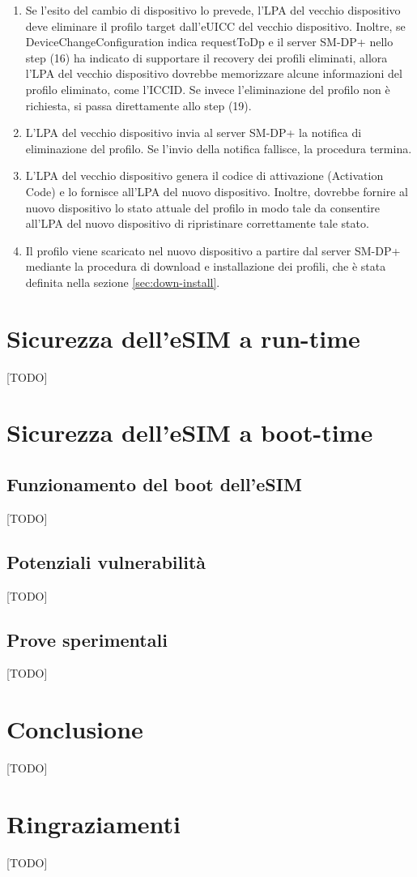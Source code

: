 \documentclass[10pt, twoside, openany]{book}
\begin{document}
\begin{enumerate}
\item Se l'esito del cambio di dispositivo lo prevede, l'LPA del vecchio dispositivo deve eliminare il profilo target dall'eUICC del vecchio dispositivo. Inoltre, se DeviceChangeConfiguration indica requestToDp e il server SM-DP+ nello step (16) ha indicato di supportare il recovery dei profili eliminati, allora l'LPA del vecchio dispositivo dovrebbe memorizzare alcune informazioni del profilo eliminato, come l'ICCID. Se invece l'eliminazione del profilo non è richiesta, si passa direttamente allo step (19).
\item L'LPA del vecchio dispositivo invia al server SM-DP+ la notifica di eliminazione del profilo. Se l'invio della notifica fallisce, la procedura termina.
\item L'LPA del vecchio dispositivo genera il codice di attivazione (Activation Code) e lo fornisce all'LPA del nuovo dispositivo. Inoltre, dovrebbe fornire al nuovo dispositivo lo stato attuale del profilo in modo tale da consentire all'LPA del nuovo dispositivo di ripristinare correttamente tale stato.
\item Il profilo viene scaricato nel nuovo dispositivo a partire dal server SM-DP+ mediante la procedura di download e installazione dei profili, che è stata definita nella sezione \ref{sec:down-install}.
\end{enumerate}

\chapter{Sicurezza dell'eSIM a run-time}
[TODO]

\chapter{Sicurezza dell'eSIM a boot-time}
\section{Funzionamento del boot dell'eSIM}
[TODO]

\section{Potenziali vulnerabilità}
[TODO]

\section{Prove sperimentali}
[TODO]

\chapter{Conclusione}
[TODO]



\chapter*{Ringraziamenti}
[TODO]
\end{document}
